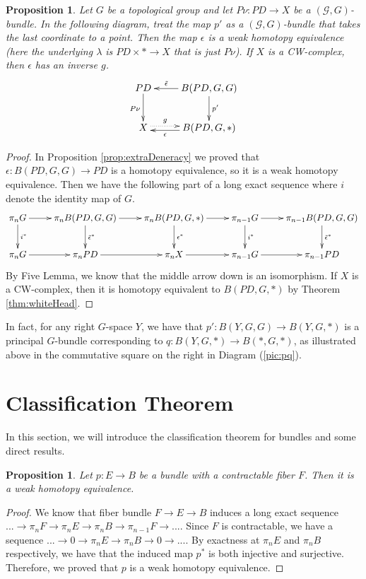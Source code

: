 \documentclass[psamsfonts]{amsart}
\newtheorem{prop}[thm]{Proposition}
\theoremstyle{definition}
\theoremstyle{remark}
\numberwithin{equation}{section}
\begin{document}
\begin{prop}
\label{prop:pq}
Let $G$ be a topological group and let $P\nu: PD \rightarrow X$ be a $(\mathcal{G}, G)$-bundle. In the following diagram, treat the map $p'$ as a $(\mathcal{G}, G)$-bundle that takes the last coordinate to a point. Then the map $\epsilon$ is a weak homotopy equivalence (here the underlying $\lambda$ is $PD \times * \to X$ that is just $P\nu$). If $X$ is a CW-complex, then $\epsilon$ has an inverse $g$. 
\[\xymatrix{
PD \ar[d]_{P\nu} & B(PD, G, G) \ar[l]_-{\tilde{\epsilon}} \ar[d]^{p'}\\
X \ar@{.>}[r]<.5ex>^-{g} & B(PD, G, *) \ar[l]<.5ex>^-{\epsilon} \\} \]
\end{prop}

\begin{proof}
In Proposition \ref{prop:extraDeneracy} we proved that $\epsilon: B(PD, G, G) \to PD$ is a homotopy equivalence, so it is a weak homotopy equivalence. Then we have the following part of a long exact sequence where $i$ denote the identity map of $G$. 
\[\xymatrix{
\pi_{n}G \ar[d]^-{i^{*}} \ar[r] & \pi_{n}B(PD, G, G) \ar[d]^-{\tilde{\epsilon}^{*}} \ar[r]& \pi_{n}B(PD, G, *) \ar[d]^{\epsilon^{*}} \ar[r] & \pi_{n - 1}G \ar[r] \ar[d]^-{i^{*}} & \pi_{n - 1}B(PD, G, G) \ar[d]^-{\tilde{\epsilon}^{*}}\\
\pi_{n}G \ar[r] & \pi_{n}PD \ar[r] & \pi_{n}X \ar[r] & \pi_{n - 1}G \ar[r] & \pi_{n - 1}PD\\} \]
By Five Lemma, we know that the middle arrow down is an isomorphism. If $X$ is a CW-complex, then it is homotopy equivalent to $B(PD, G, *)$ by Theorem \ref{thm:whiteHead}.
\end{proof}

In fact, for any right $G$-space $Y$, we have that $p': B(Y, G, G) \rightarrow B(Y, G, *)$ is a principal $G$-bundle corresponding to $q: B(Y, G, *) \rightarrow B(*, G, *)$, as illustrated above in the commutative square on the right in Diagram (\ref{pic:pq}).

\section{Classification Theorem}
\label{sec:class}
In this section, we will introduce the classification theorem for bundles and some direct results.

\begin{prop}
\label{prop: contractable}
Let $p: E \to B$ be a bundle with a contractable fiber $F$. Then it is a weak homotopy equivalence. 
\end{prop}
\begin{proof}
We know that fiber bundle $F \to E \to B$ induces a long exact sequence $... \to \pi_{n}F \to \pi_{n}E \to \pi_{n}B \to \pi_{n - 1}F \to...$. Since $F$ is contractable, we have a sequence $... \to 0 \to \pi_{n}E \to \pi_{n}B \to 0 \to...$. By exactness at $\pi_{n}E$ and $\pi_{n}B$ respectively, we have that the induced map $p^{*}$ is both injective and surjective. Therefore, we proved that $p$ is a weak homotopy equivalence.
\end{proof}
\end{document}
